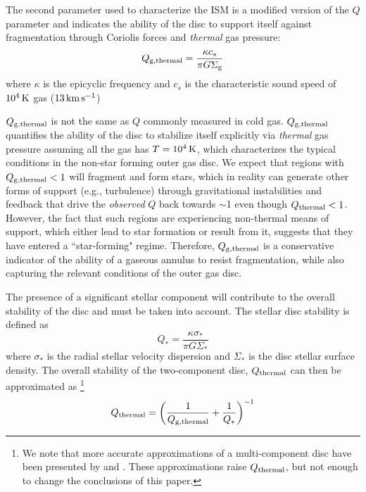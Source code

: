 \documentclass[fleqn,usenatbib]{mnras}
\newcommand{\qh}{Q_{\rm thermal}}
\newcommand{\qgh}{Q_{\rm g,thermal}}
\begin{document}
The second parameter used to characterize the ISM is a modified version of the \citet{Toomre64} $Q$ parameter and indicates the ability of the disc to support itself against fragmentation through Coriolis forces and {\it thermal} gas pressure:
\begin{equation}
\label{eq:q}
\qgh=\frac{\kappa c_s}{\pi G \Sigma_{\rm g}}
\end{equation}
where $\kappa$ is the epicyclic frequency and $c_s$ is the characteristic sound speed of $10^4\,{\rm K}$ gas ($13\,{\rm km\,s^{-1}}$) 
  
$\qgh$ is not the same as $Q$ commonly measured in cold gas. $\qgh$ quantifies the ability of the disc to stabilize itself explicitly via {\it thermal} gas pressure assuming all the gas has $T=10^4\,{\rm K}$, which characterizes the typical conditions in the non-star forming outer gas disc. We expect that regions with $\qgh<1$ will fragment and form stars, which in reality can generate other forms of support (e.g., turbulence) through gravitational instabilities and feedback that drive the {\it observed} $Q$ back towards $\sim$1 even though $\qh < 1$. However, the fact that such regions are experiencing non-thermal means of support, which either lead to star formation or result from it, suggests that they have entered a ``star-forming" regime.  Therefore, $\qgh$ is a conservative indicator of the ability of a gaseous annulus to resist fragmentation, while also capturing the relevant conditions of the outer gas disc.  
  
The presence of a significant stellar component will contribute to the overall stability of the disc and must be taken into account.  The stellar disc stability is defined as
\begin{equation}
Q_*=\frac{\kappa\sigma_*}{\pi G \Sigma_*}
\end{equation}
where $\sigma_*$ is the radial stellar velocity dispersion and $\Sigma_*$ is the disc stellar surface density. The overall stability of the two-component disc, $\qh$ can then be approximated as \citep{Wang94}\footnote{We note that more accurate approximations of a multi-component disc have been presented by \citet{Romeo11} and \citet{Romeo13}. These approximations raise $Q_{\rm thermal}$, but not enough to change the conclusions of this paper.}
\begin{equation}
\qh=\left(\frac{1}{\qgh}+\frac{1}{Q_*}\right)^{-1}
\end{equation}
    
  
\end{document}
